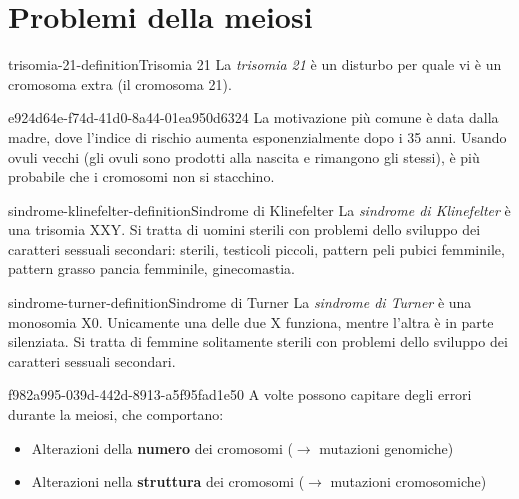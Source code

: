 \documentclass[preview]{standalone}
\begin{document}
\genpage

\section{Problemi della meiosi}

\begin{snippetdefinition}{trisomia-21-definition}{Trisomia 21}
    La \textit{trisomia 21} è un disturbo per quale vi è un cromosoma extra (il cromosoma 21).
\end{snippetdefinition}


\begin{snippet}{e924d64e-f74d-41d0-8a44-01ea950d6324}
    La motivazione più comune è data dalla madre, dove l'indice di rischio aumenta
    esponenzialmente dopo i 35 anni.
    Usando ovuli vecchi (gli ovuli sono prodotti alla nascita e rimangono gli stessi),
    è più probabile che i cromosomi non si stacchino.
\end{snippet}


\begin{snippetdefinition}{sindrome-klinefelter-definition}{Sindrome di Klinefelter}
    La \textit{sindrome di Klinefelter}
    è una trisomia XXY. Si tratta di uomini sterili con problemi dello sviluppo
    dei caratteri sessuali secondari:
    sterili, testicoli piccoli, pattern peli pubici femminile,
    pattern grasso pancia femminile, ginecomastia.
\end{snippetdefinition}

\begin{snippetdefinition}{sindrome-turner-definition}{Sindrome di Turner}
    La \textit{sindrome di Turner} è
    una monosomia X0. Unicamente una delle due X funziona,
    mentre l'altra è in parte silenziata. Si tratta di femmine
    solitamente sterili con problemi dello sviluppo dei caratteri sessuali secondari.
\end{snippetdefinition}

\begin{snippet}{f982a995-039d-442d-8913-a5f95fad1e50}
    A volte possono capitare degli errori durante la meiosi, che comportano:
    \begin{itemize}
        \item Alterazioni della \textbf{numero} dei cromosomi (\(\rightarrow\) mutazioni genomiche)
        \item Alterazioni nella \textbf{struttura} dei cromosomi (\(\rightarrow\) mutazioni cromosomiche)
    \end{itemize}
\end{snippet}
\end{document}
